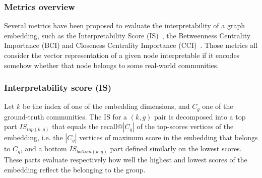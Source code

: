 \subsubsection{Metrics overview}\label{sec:metrics}
Several metrics have been proposed to evaluate the interpretability of a graph embedding, such as the Interpretability Score (IS)~\cite{gogoglou_2019}, the Betweenness Centrality Importance (BCI) and Closeness Centrality Importance (CCI)~\cite{khoshraftar2021}. Those metrics all consider the vector representation of a given node interpretable if it encodes somehow whether that node belongs to some real-world communities. 



\subsubsection{Interpretability score (IS)}
Let $k$ be the index of one of the embedding dimensions, and $C_g$ one of the ground-truth communities. The IS for a $(k, g)$ pair is decomposed into a top part $IS_{top(k, g)}$ 
that equals the recall@$|C_g|$ of the top-scores vertices of the embedding, i.e. the $|C_g|$ vertices of maximum score in the embedding that belongs to $C_g$, and a bottom $IS_{bottom(k, g)}$ part defined similarly on the lowest scores.
These parts evaluate respectively how well the highest and lowest scores of the embedding reflect the belonging to the group.

